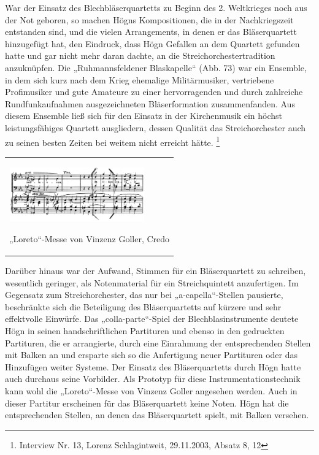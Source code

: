 War der Einsatz des Blechbläserquartetts zu Beginn des 2. Weltkrieges
noch aus der Not geboren, so machen Högns Kompositionen, die in der
Nachkriegszeit entstanden sind, und die vielen Arrangements, in denen
er das Bläserquartett hinzugefügt hat, den Eindruck, dass Högn Gefallen
an dem Quartett gefunden hatte und gar nicht mehr daran dachte, an die
Streichorchestertradition anzuknüpfen. Die „Ruhmannsfeldener
Blaskapelle“ (Abb. 73) war ein Ensemble, in dem sich kurz nach dem
Krieg ehemalige Militärmusiker, vertriebene Profimusiker und gute
Amateure zu einer hervorragenden und durch zahlreiche Rundfunkaufnahmen
ausgezeichneten Bläserformation zusammenfanden. Aus diesem Ensemble
ließ sich für den Einsatz in der Kirchenmusik ein höchst
leistungsfähiges Quartett ausgliedern, dessen Qualität das
Streichorchester auch zu seinen besten Zeiten bei weitem nicht erreicht
hätte. \footnote{Interview Nr. 13, Lorenz Schlagintweit, 29.11.2003,
Absatz 8, 12}

\begin{flushleft}
\tablefirsthead{}
\tablehead{}
\tabletail{}
\tablelasttail{}
\begin{supertabular}{m{6.019cm}}

\begin{center}

\includegraphics[width=5.837cm,height=2.35cm]{pictures/zulassungsarbeit-img075.png}

\end{center}
„Loreto“-Messe von Vinzenz Goller,
Credo\\
\end{supertabular}
\end{flushleft}

\begin{figure}
\img{}
\caption{}
\end{figure}

Darüber hinaus war der Aufwand, Stimmen für ein Bläserquartett zu
schreiben, wesentlich geringer, als Notenmaterial für ein
Streichquintett anzufertigen. Im Gegensatz zum Streichorchester, das
nur bei „a-capella“-Stellen pausierte, beschränkte sich die Beteiligung
des Bläserquartetts auf kürzere und sehr effektvolle Einwürfe. Das
„colla-parte“-Spiel der Blechblasinstrumente deutete Högn in seinen
handschriftlichen Partituren und ebenso in den gedruckten Partituren,
die er arrangierte, durch eine Einrahmung der entsprechenden Stellen
mit Balken an und ersparte sich so die Anfertigung neuer Partituren
oder das Hinzufügen weiter Systeme. Der Einsatz des Bläserquartetts
durch Högn hatte auch durchaus seine Vorbilder. Als Prototyp für diese
Instrumentationstechnik kann wohl die „Loreto“-Messe von Vinzenz Goller
angesehen werden. Auch in dieser Partitur erscheinen für das
Bläserquartett keine Noten. Högn hat die entsprechenden Stellen, an
denen das Bläserquartett spielt, mit Balken versehen.

